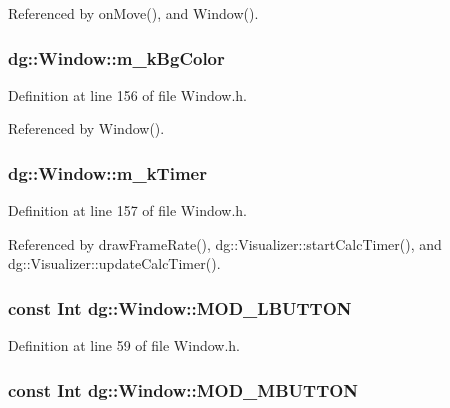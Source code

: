 Referenced by on\-Move(), and Window().
\subsubsection{ dg::Window::m\_\-k\-Bg\-Color\hspace{0.3cm}{\tt  [protected]}}\label{classdg_1_1Window_n16}




Definition at line 156 of file Window.h.

Referenced by Window().
\subsubsection{ dg::Window::m\_\-k\-Timer\hspace{0.3cm}{\tt  [protected]}}\label{classdg_1_1Window_n17}




Definition at line 157 of file Window.h.

Referenced by draw\-Frame\-Rate(), dg::Visualizer::start\-Calc\-Timer(), and dg::Visualizer::update\-Calc\-Timer().
\subsubsection{\setlength{\rightskip}{0pt plus 5cm}const {\bf Int} dg::Window::MOD\_\-LBUTTON\hspace{0.3cm}{\tt  [static]}}\label{classdg_1_1Window_p32}




Definition at line 59 of file Window.h.
\subsubsection{\setlength{\rightskip}{0pt plus 5cm}const {\bf Int} dg::Window::MOD\_\-MBUTTON\hspace{0.3cm}{\tt  [static]}}\label{classdg_1_1Window_p33}




